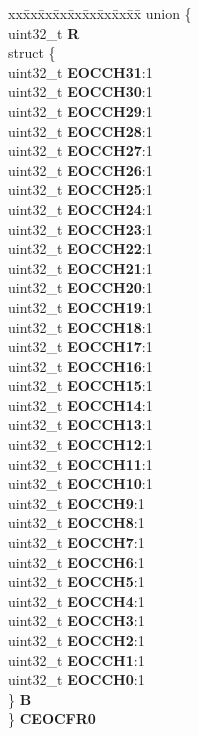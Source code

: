\begin{DoxyCompactItemize}
\begin{tabbing}
\end{tabbing}\item 
\mbox{\label{structADC__tag_a26d42d7e00fdbfc1a98f569caeacddde}} 
\begin{tabbing}
xx\=xx\=xx\=xx\=xx\=xx\=xx\=xx\=xx\=\kill
union \{\\
\>uint32\_t {\bfseries R}\\
\>struct \{\\
\>\>uint32\_t {\bfseries EOCCH31}:1\\
\>\>uint32\_t {\bfseries EOCCH30}:1\\
\>\>uint32\_t {\bfseries EOCCH29}:1\\
\>\>uint32\_t {\bfseries EOCCH28}:1\\
\>\>uint32\_t {\bfseries EOCCH27}:1\\
\>\>uint32\_t {\bfseries EOCCH26}:1\\
\>\>uint32\_t {\bfseries EOCCH25}:1\\
\>\>uint32\_t {\bfseries EOCCH24}:1\\
\>\>uint32\_t {\bfseries EOCCH23}:1\\
\>\>uint32\_t {\bfseries EOCCH22}:1\\
\>\>uint32\_t {\bfseries EOCCH21}:1\\
\>\>uint32\_t {\bfseries EOCCH20}:1\\
\>\>uint32\_t {\bfseries EOCCH19}:1\\
\>\>uint32\_t {\bfseries EOCCH18}:1\\
\>\>uint32\_t {\bfseries EOCCH17}:1\\
\>\>uint32\_t {\bfseries EOCCH16}:1\\
\>\>uint32\_t {\bfseries EOCCH15}:1\\
\>\>uint32\_t {\bfseries EOCCH14}:1\\
\>\>uint32\_t {\bfseries EOCCH13}:1\\
\>\>uint32\_t {\bfseries EOCCH12}:1\\
\>\>uint32\_t {\bfseries EOCCH11}:1\\
\>\>uint32\_t {\bfseries EOCCH10}:1\\
\>\>uint32\_t {\bfseries EOCCH9}:1\\
\>\>uint32\_t {\bfseries EOCCH8}:1\\
\>\>uint32\_t {\bfseries EOCCH7}:1\\
\>\>uint32\_t {\bfseries EOCCH6}:1\\
\>\>uint32\_t {\bfseries EOCCH5}:1\\
\>\>uint32\_t {\bfseries EOCCH4}:1\\
\>\>uint32\_t {\bfseries EOCCH3}:1\\
\>\>uint32\_t {\bfseries EOCCH2}:1\\
\>\>uint32\_t {\bfseries EOCCH1}:1\\
\>\>uint32\_t {\bfseries EOCCH0}:1\\
\>\} {\bfseries B}\\
\} {\bfseries CEOCFR0}\\


\end{tabbing}
\end{DoxyCompactItemize}

